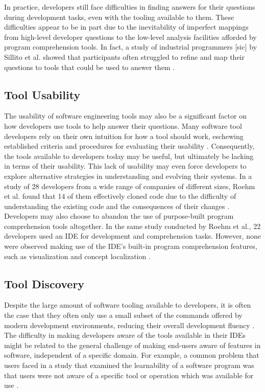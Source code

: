 \noindent In practice, developers still face difficulties in finding answers 
for their questions during development tasks, even with the tooling available 
to them.
These difficulties appear to be in part due to the inevitability of imperfect 
mappings from high-level developer questions to the low-level analysis 
facilities afforded by program comprehension tools.
In fact, a study of industrial programmers [sic] by Sillito et al. showed that 
participants often struggled to refine and map their questions to tools
that could be used to answer them \cite{sillito-2006-questions-during-task}.

\subsection{Tool Usability}
\label{subsec:ToolUsability}

\par The usability of software engineering tools may also be a significant
factor on how developers use tools to help answer their questions.
Many software tool developers rely on their own intuition for how a tool should
work, eschewing established criteria and procedures for evaluating their 
usability \cite{toleman-98-soft-tools}.
Consequently, the tools available to developers today may be useful, but
ultimately be lacking in terms of their usability.
This lack of usability may even force developers to explore alternative
strategies in understanding and evolving their systems.
In a study of 28 developers from a wide range of companies of different sizes,
Roehm et al. found that 14 of them effectively cloned code due to the
difficulty of understanding the existing code and the consequences of their
changes \cite{roehm-2012-comprehend-software}.
Developers may also choose to abandon the use of purpose-built program
comprehension tools altogether.
In the same study conducted by Roehm et al., 22 developers used an IDE
for development and comprehension tasks.
However, none were observed making use of the IDE's built-in program 
comprehension features, such as visualization and concept localization
\cite{roehm-2012-comprehend-software}.

\subsection{Tool Discovery}
\label{subsec:ToolDiscovery}

Despite the large amount of software tooling available to developers,
it is often the case that they often only use a small subset of the 
commands offered by modern development environments, reducing their overall 
development fluency \cite{murphy-hill-2012-recommend}.
The difficulty in making developers aware of the tools available in their
\acp{IDE} might be related to the general challenge of making end-users aware
of features in software, independent of a specific domain.
For example, a common problem that users faced in a study that examined the
learnability of a software program was that users were not aware of a specific
tool or operation which was available for use \cite{grossman-2009-soft-learn}.

